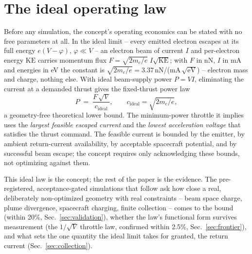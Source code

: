 \documentclass[11pt]{article}
\begin{document}
\section{The ideal operating law}
\label{sec:throttle}
Before any simulation, the concept's operating economics can be stated with
no free parameters at all. In the ideal limit -- every emitted electron
escapes at its full energy $e(V-\varphi)$, $\varphi \ll V$ -- an electron
beam of current $I$ and per-electron energy $\mathrm{KE}$ carries momentum
flux $F = \sqrt{2 m_e/e}\; I \sqrt{\mathrm{KE}}$; with $F$ in nN, $I$ in mA
and energies in eV the constant is
$\sqrt{2 m_e/e} = 3.37$\,nN/(mA\,$\sqrt{\mathrm{eV}}$) -- electron mass
and charge, nothing else. With ideal beam-supply power $P = VI$,
eliminating the current at a demanded thrust gives the fixed-thrust power
law
\[
P \;=\; \frac{F\,\sqrt{V}}{c_{\mathrm{ideal}}},
\qquad c_{\mathrm{ideal}} = \sqrt{2 m_e/e},
\]
a geometry-free theoretical lower bound. The minimum-power throttle it
implies uses the \emph{largest feasible escaped current} and the
\emph{lowest acceleration voltage} that satisfies the thrust command. The
feasible current is bounded by the emitter, by ambient return-current
availability, by acceptable spacecraft potential, and by successful beam
escape; the concept requires only acknowledging these bounds, not
optimizing against them.

This ideal law is the concept; the rest of the paper is the evidence. The
pre-registered, acceptance-gated simulations that follow ask how close a
real, deliberately non-optimized geometry with real constraints -- beam
space charge, plume divergence, spacecraft charging, finite collection --
comes to the bound (within 20\%,
Sec.~\ref{sec:validation}), whether the law's functional form survives
measurement (the $1/\sqrt{V}$ throttle law, confirmed within 2.5\%,
Sec.~\ref{sec:frontier}), and what sets the one quantity the ideal limit
takes for granted, the return current (Sec.~\ref{sec:collection}).
\end{document}
